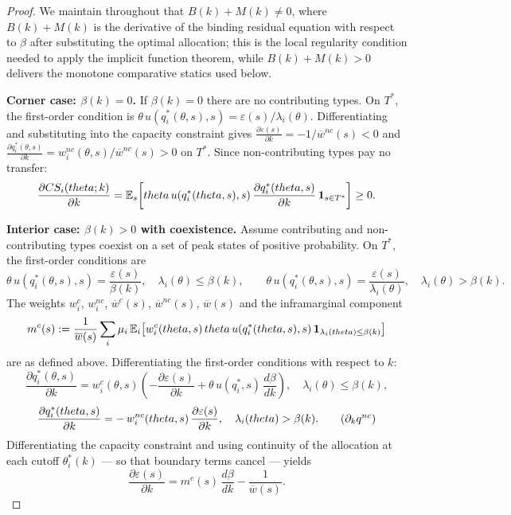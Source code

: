 \documentclass[master.tex]{subfiles}
\begin{document}
\begin{proof}

We maintain throughout that $B(k)+M(k)\neq 0$, where $B(k)+M(k)$ is the derivative of the binding residual equation with respect to $\beta$ after substituting the optimal allocation; this is the local regularity condition needed to apply the implicit function theorem, while $B(k)+M(k)>0$ delivers the monotone comparative statics used below.

\noindent\textbf{Corner case: $\beta(k)=0$.} If $\beta(k)=0$ there are no contributing types. On $T^*$, the first-order condition is $\theta\,u(q_i^*(\theta,s),s) = \varepsilon(s)/\lambda_i(\theta)$. Differentiating and substituting into the capacity constraint gives $\frac{\partial\varepsilon(s)}{\partial k} = -1/\overline w^{nc}(s) < 0$ and $\frac{\partial q_i^*(\theta,s)}{\partial k} = w_i^{nc}(\theta,s)/\overline w^{nc}(s) > 0$ on $T^*$. Since non-contributing types pay no transfer:
\[
\frac{\partial CS_i(theta;k)}{\partial k} = \mathbb{E}_s\!\left[theta\,u(q_i^*(theta,s),s)\,\frac{\partial q_i^*(theta,s)}{\partial k}\,\mathbf{1}_{s\in T^*}\right] \geq 0.
\]

\noindent\textbf{Interior case: $\beta(k)>0$ with coexistence.} Assume contributing and non-contributing types coexist on a set of peak states of positive probability. On $T^*$, the first-order conditions are
\[
\theta\,u(q_i^*(\theta,s),s) = \frac{\varepsilon(s)}{\beta(k)}, \quad \lambda_i(\theta)\leq\beta(k), \qquad \theta\,u(q_i^*(\theta,s),s) = \frac{\varepsilon(s)}{\lambda_i(\theta)}, \quad \lambda_i(\theta)>\beta(k).
\]
The weights $w_i^c$, $w_i^{nc}$, $\overline w^c(s)$, $\overline w^{nc}(s)$, $\overline w(s)$ and the inframarginal component
\[
m^c(s) := \frac{1}{\overline w(s)}\sum_i\mu_i\,\mathbb{E}_i\!\left[w_i^c(theta,s)\,theta\,u(q_i^*(theta,s),s)\,\mathbf{1}_{\lambda_i(theta)\leq\beta(k)}\right]
\]
are as defined above. Differentiating the first-order conditions with respect to $k$:
\[
\frac{\partial q_i^*(\theta,s)}{\partial k} = w_i^c(\theta,s)\!\left(-\frac{\partial\varepsilon(s)}{\partial k} + \theta\,u(q_i^*,s)\,\frac{d\beta}{dk}\right), \quad \lambda_i(\theta)\leq\beta(k), \tag{$\partial_k q^c$}\label{dqc}
\]
\[
\frac{\partial q_i^*(\theta,s)}{\partial k} = -\,w_i^{nc}(\theta,s)\,\frac{\partial\varepsilon(s)}{\partial k}, \quad \lambda_i(\theta)>\beta(k). \tag{$\partial_k q^{nc}$}\label{dqnc}
\]
Differentiating the capacity constraint and using continuity of the allocation at each cutoff $\theta_i^*(k)$ --- so that boundary terms cancel --- yields
\[
\frac{\partial\varepsilon(s)}{\partial k} = m^c(s)\,\frac{d\beta}{dk} - \frac{1}{\overline w(s)}. \tag{$\partial_k\varepsilon$}\label{depsk}
\]


\end{proof}
\end{document}
